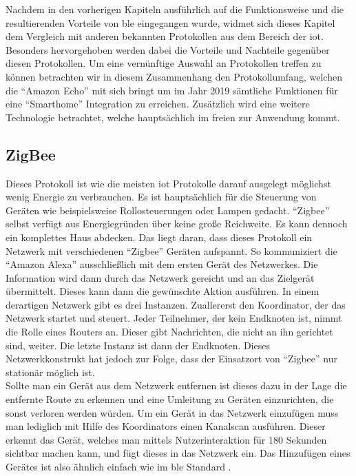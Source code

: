 Nachdem in den vorherigen Kapiteln ausführlich auf die Funktionsweise und die resultierenden Vorteile von \ac{ble} eingegangen wurde, widmet sich dieses Kapitel dem Vergleich mit anderen bekannten Protokollen aus dem Bereich der \ac{iot}. Besonders hervorgehoben werden dabei die Vorteile und Nachteile gegenüber diesen Protokollen. Um eine vernünftige Auswahl an Protokollen treffen zu können betrachten wir in diesem Zusammenhang den Protokollumfang, welchen die "`Amazon Echo"' mit sich bringt um im Jahr 2019 sämtliche Funktionen für eine "`Smarthome"' Integration zu erreichen. Zusätzlich wird eine weitere Technologie betrachtet, welche hauptsächlich im freien zur Anwendung kommt.\\  

\subsection{ZigBee}
\label{ss:vergleich:zigbee}

Dieses Protokoll ist wie die meisten \ac{iot} Protokolle darauf ausgelegt möglichst wenig Energie zu verbrauchen. Es ist hauptsächlich für die Steuerung von Geräten wie beispielsweise Rollosteuerungen oder Lampen gedacht. "`Zigbee"' selbst verfügt aus Energiegründen über keine große Reichweite. Es kann dennoch ein komplettes Haus abdecken. Das liegt daran, dass dieses Protokoll ein Netzwerk mit verschiedenen "`Zigbee"' Geräten aufspannt. So kommuniziert die "`Amazon Alexa"' ausschließlich mit dem ersten Gerät des Netzwerkes. Die Information wird dann durch das Netzwerk gereicht und an das Zielgerät übermittelt. Dieses kann dann die gewünschte Aktion ausführen. In einem derartigen Netzwerk gibt es drei Instanzen. Zuallererst den Koordinator, der das Netzwerk startet und steuert. Jeder Teilnehmer, der kein Endknoten ist, nimmt die Rolle eines Routers an. Dieser gibt Nachrichten, die nicht an ihn gerichtet sind, weiter. Die letzte Instanz ist dann der Endknoten. Dieses Netzwerkkonstrukt hat jedoch zur Folge, dass der Einsatzort von "`Zigbee"' nur stationär möglich ist.\\

\noindent Sollte man ein Gerät aus dem Netzwerk entfernen ist dieses dazu in der Lage die entfernte Route zu erkennen und eine Umleitung zu Geräten einzurichten, die sonst verloren werden würden. Um ein Gerät in das Netzwerk einzufügen muss man lediglich mit Hilfe des Koordinators einen Kanalscan ausführen. Dieser erkennt das Gerät, welches man mittels Nutzerinteraktion für 180 Sekunden sichtbar machen kann, und fügt dieses in das Netzwerk ein. Das Hinzufügen eines Gerätes ist also ähnlich einfach wie im \ac{ble} Standard \cite{ZA:Zig}.\\

